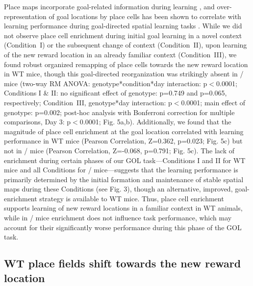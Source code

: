 Place maps incorporate goal-related information during learning \citep{Breese1989}\citep{Dupret2010b}\citep{Fyhn2002}\citep{Gothard1996}\citep{Hok2007}\citep{Hollup2001b}\citep{Kobayashi1997}, and over-representation of goal locations by place cells has been shown to correlate with learning performance during goal-directed spatial learning tasks \citep{Dupret2010a}\citep{Hollup2001b}.  While we did not observe place cell enrichment during initial goal learning in a novel context (Condition~I) or the subsequent change of context (Condition~II), upon learning of the new reward location in an already familiar context (Condition~III), we found robust organized remapping of place cells towards the new reward location in WT mice, though this goal-directed reorganization was strikingly absent in \df/ mice (two-way RM ANOVA: genotype*condition*day interaction: p$<$0.0001; Conditions I \& II: no significant effect of genotype:  p=0.749 and p=0.065, respectively; Condition~III, genotype*day interaction: p$<$0.0001; main effect of genotype: p=0.002; post-hoc analysis with Bonferroni correction for multiple comparisons, Day 3: p$<$0.0001; Fig. 5a,b).  Additionally, we found that the magnitude of place cell enrichment at the goal location correlated with learning performance in WT mice (Pearson Correlation, Z=0.362, p=0.023; Fig. 5c) but not in \df/ mice (Pearson Correlation, Z=-0.068, p=0.791; Fig. 5c). The lack of enrichment during certain phases of our GOL task—Conditions I and II for WT mice and all Conditions for \df/ mice—suggests that the learning performance is primarily determined by the initial formation and maintenance of stable spatial maps during these Conditions (see Fig. 3), though an alternative, improved, goal-enrichment strategy is available to WT mice. Thus, place cell enrichment supports learning of new reward locations in a familiar context in WT animals, while in \df/ mice enrichment does not influence task performance, which may account for their significantly worse performance during this phase of the GOL task.

\subsection{WT place fields shift towards the new reward location}

